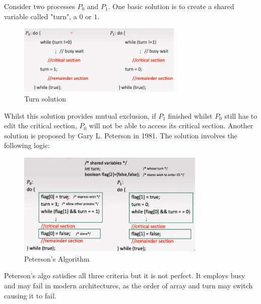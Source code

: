 \documentclass[a4paper]{article}
\theoremstyle{plain}
\theoremstyle{definition}
\newtheorem{exmp}{Example}[section]
\theoremstyle{remark}
\begin{document}
\begin{tcolorbox}[colback=black!3!white,colframe=black!60!white,title=\begin{exmp}Possible solution for two processes \label{Possible solution for two processes}\end{exmp}]
        Consider two processes $P_0$ and $P_1$. One basic solution is to create a shared variable called "turn", a $0$ or $1$. 
	\begin{figure}[H]
		\centering
		\includegraphics[width=0.7\textwidth]{fourty.png}
		\caption{Turn solution}
		\label{fig:fourty-png}
	\end{figure}
	Whilst this solution provides mutual exclusion, if $P_1$ finished whilst $P_0$ still has to edit the critical section, $P_0$ will not be able to access its critical section. Another solution is proposed by Gary L. Peterson in 1981. The solution involves the following logic:
	\begin{figure}[H]
		\centering
		\includegraphics[width=0.8\textwidth]{fourtyone.png}
		\caption{Peterson's Algorithm}
		\label{fig:fourtyone-png}
	\end{figure}
Peterson's algo satisfies all three criteria but it is not perfect. It employs busy and may fail in modern architectures, as the order of array and turn may switch causing it to fail.
\end{tcolorbox}
\end{document}
